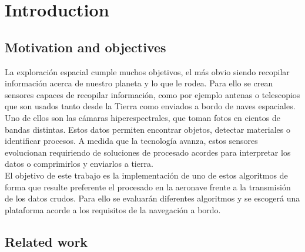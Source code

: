 \cleardoublepage
\chapter{Introduction}
\label{makereference}

\section{Motivation and objectives}

La exploración espacial cumple muchos objetivos, el más obvio siendo recopilar información acerca de nuestro planeta y lo que le rodea. Para ello se crean sensores capaces de recopilar información, como por ejemplo antenas o telescopios que son usados tanto desde la Tierra como enviados a bordo de naves espaciales. Uno de ellos son las cámaras hiperespectrales, que toman fotos en cientos de bandas distintas. Estos datos permiten encontrar objetos, detectar materiales o identificar procesos. A medida que la tecnología avanza, estos sensores evolucionan requiriendo de soluciones de procesado acordes para interpretar los datos o comprimirlos y enviarlos a tierra.
\\
El objetivo de este trabajo es la implementación de uno de estos algoritmos de forma que resulte preferente el procesado en la aeronave frente a la transmisión de los datos crudos. Para ello se evaluarán diferentes algoritmos y se escogerá una plataforma acorde a los requisitos de la navegación a bordo.

\section{Related work}

